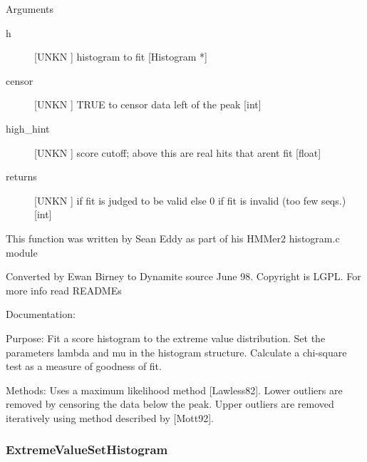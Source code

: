 Arguments
\begin{description}
\item[h] [UNKN ] histogram to fit [Histogram *]
\item[censor] [UNKN ] TRUE to censor data left of the peak [int]
\item[high_hint] [UNKN ] score cutoff; above this are real hits that arent fit [float]
\item[returns] [UNKN ] if fit is judged to be valid else 0 if fit is invalid (too few seqs.) [int]
\end{description}


This function was written by Sean Eddy
as part of his HMMer2 histogram.c module


Converted by Ewan Birney to Dynamite source June 98.
Copyright is LGPL. For more info read READMEs


Documentation:


Purpose:  Fit a score histogram to the extreme value 
distribution. Set the parameters lambda
and mu in the histogram structure. Calculate
a chi-square test as a measure of goodness of fit. 


Methods:  Uses a maximum likelihood method [Lawless82].
Lower outliers are removed by censoring the data below the peak.
Upper outliers are removed iteratively using method 
described by [Mott92].


\subsubsection{ExtremeValueSetHistogram}

